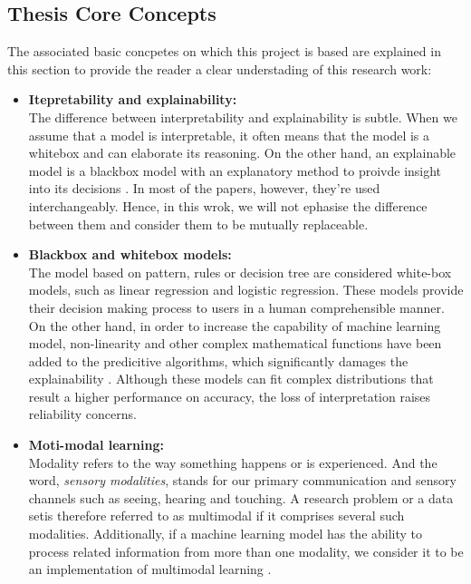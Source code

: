 \subsection{Thesis Core Concepts}
The associated basic concpetes on which this project is based are explained in this section to provide the reader a clear understading of this research work:

\begin{itemize}
    \item \textbf{Itepretability and explainability:} \\ The difference between interpretability and explainability is subtle. When we assume that a model is interpretable, it often means that the model is a whitebox and can elaborate its reasoning. On the other hand, an explainable model is a blackbox model with an explanatory method to proivde insight into its decisions \citep{doshivelez2017RigorousInterpretable}. In most of the papers, however, they're used interchangeably. Hence, in this wrok, we will not ephasise the difference between them and consider them to be mutually replaceable. \\
    \item \textbf{Blackbox and whitebox models:} \\ The model based on pattern, rules or decision tree are considered white-box models, such as linear regression and logistic regression. These models provide their decision making process to users in a human comprehensible manner. On the other hand, in order to increase the capability of machine learning model, non-linearity and other complex mathematical functions have been added to the predicitive algorithms, which significantly damages the explainability \citep{LoyolaGonzalez2019BlackBoxVsWhiteBox}. Although  these models can fit complex distributions that result a higher performance on accuracy, the loss of interpretation raises reliability concerns.\\
    \item \textbf{Moti-modal learning:} \\ Modality refers to the way something happens or is experienced. And the word, \textit{sensory modalities}, stands for our primary communication and sensory channels such as seeing, hearing and touching. A research problem or a data setis therefore referred to as multimodal if it comprises several such modalities. Additionally, if a machine learning model has the ability to process related information from more than one modality, we consider it to be an implementation of multimodal learning \citep{Baltrušaitis2019MutimodalSurvey}. \\

\end{itemize}
